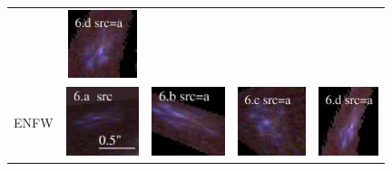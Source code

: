 \documentclass[useAMS,usenatbib]{mn2e}
\begin{document}
\begin{table}
\begin{tabular}{ccccc}
    & \multicolumn{1}{m{1.7cm}}{\includegraphics[height=2.00cm,clip]{figs/nsie_img/rgb.pre_6_d_a_tri.ps}} \\
    \multicolumn{1}{m{1cm}}{{\Large ENFW}}
    & \multicolumn{1}{m{1.7cm}}{\includegraphics[height=2.00cm,clip]{figs/enfw_img/rgb.src_6_a.ps}}
    & \multicolumn{1}{m{1.7cm}}{\includegraphics[height=2.00cm,clip]{figs/enfw_img/rgb.pre_6_b_a_tri.ps}}
    & \multicolumn{1}{m{1.7cm}}{\includegraphics[height=2.00cm,clip]{figs/enfw_img/rgb.pre_6_c_a_tri.ps}}
    & \multicolumn{1}{m{1.7cm}}{\includegraphics[height=2.00cm,clip]{figs/enfw_img/rgb.pre_6_d_a_tri.ps}} \\
  \end{tabular}

\end{table}

\clearpage
\end{document}
